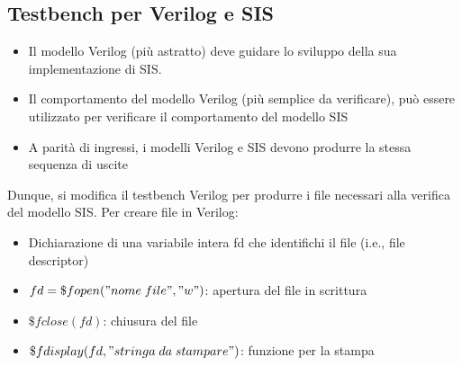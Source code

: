 \documentclass[a4paper]{article}
\theoremstyle{break}
\theoremstyle{break}
\theoremstyle{break}
\theoremstyle{break}
\begin{document}
\subsection{Testbench per Verilog e SIS}
\begin{itemize}
  \item Il modello Verilog (più astratto) deve guidare lo sviluppo della sua implementazione di SIS.
  \item Il comportamento del modello Verilog (più semplice da verificare), può
  essere utilizzato per verificare il comportamento del modello SIS
  \item A parità di ingressi, i modelli Verilog e SIS devono produrre la stessa
  sequenza di uscite
\end{itemize}
Dunque, si modifica il testbench Verilog per produrre i file necessari alla
verifica del modello SIS. Per creare file in Verilog:
\begin{itemize}
  \item Dichiarazione di una variabile intera fd che identifichi il file (i.e., file
  descriptor)
  \item \( fd = \$fopen("nome\;file", "w") \): apertura del file in scrittura 
  \item \( \$fclose(fd) \): chiusura del file
  \item \( \$fdisplay(fd, "stringa\;da\;stampare") \): funzione per la stampa
\end{itemize}
\end{document}
